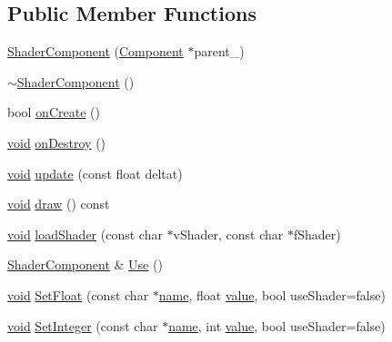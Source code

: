 \subsection*{Public Member Functions}
\begin{DoxyCompactItemize}
\item 
\hyperlink{classShaderComponent_a85854a674af6364cf113117964a07170}{Shader\+Component} (\hyperlink{classComponent}{Component} $\ast$parent\+\_\+)
\item 
\hyperlink{classShaderComponent_a8bb8e340123f28784cddaa2bf627c040}{$\sim$\+Shader\+Component} ()
\item 
bool \hyperlink{classShaderComponent_a0c42362c7ba178050551e7451b49abe5}{on\+Create} ()
\item 
\hyperlink{imgui__impl__opengl3__loader_8h_ac668e7cffd9e2e9cfee428b9b2f34fa7}{void} \hyperlink{classShaderComponent_a7ebd7c8ee1b2aea5ad2010a4652bb588}{on\+Destroy} ()
\item 
\hyperlink{imgui__impl__opengl3__loader_8h_ac668e7cffd9e2e9cfee428b9b2f34fa7}{void} \hyperlink{classShaderComponent_ab8f4b5e17bf77b20e509ac94c9dddc10}{update} (const float deltat)
\item 
\hyperlink{imgui__impl__opengl3__loader_8h_ac668e7cffd9e2e9cfee428b9b2f34fa7}{void} \hyperlink{classShaderComponent_a1ac6a772f197d759e9ae11fae0551687}{draw} () const
\item 
\hyperlink{imgui__impl__opengl3__loader_8h_ac668e7cffd9e2e9cfee428b9b2f34fa7}{void} \hyperlink{classShaderComponent_afc567dab2f49c5e161cf6e9489a5667f}{load\+Shader} (const char $\ast$v\+Shader, const char $\ast$f\+Shader)
\item 
\hyperlink{classShaderComponent}{Shader\+Component} \& \hyperlink{classShaderComponent_aecf930a4a91e58138270d4edb92c3f98}{Use} ()
\item 
\hyperlink{imgui__impl__opengl3__loader_8h_ac668e7cffd9e2e9cfee428b9b2f34fa7}{void} \hyperlink{classShaderComponent_a043aa71f2b2efc6718f587d22a9b6d8c}{Set\+Float} (const char $\ast$\hyperlink{imgui__impl__opengl3__loader_8h_a5c4947d4516dd7cfa3505ce3a648a4ef}{name}, float \hyperlink{imgui__impl__opengl3__loader_8h_a32aff7c6c4cd253fdf6563677afab5ce}{value}, bool use\+Shader=false)
\item 
\hyperlink{imgui__impl__opengl3__loader_8h_ac668e7cffd9e2e9cfee428b9b2f34fa7}{void} \hyperlink{classShaderComponent_a23f051529e36aeb7ccddaf4ff543cebc}{Set\+Integer} (const char $\ast$\hyperlink{imgui__impl__opengl3__loader_8h_a5c4947d4516dd7cfa3505ce3a648a4ef}{name}, int \hyperlink{imgui__impl__opengl3__loader_8h_a32aff7c6c4cd253fdf6563677afab5ce}{value}, bool use\+Shader=false)

\end{DoxyCompactItemize}

